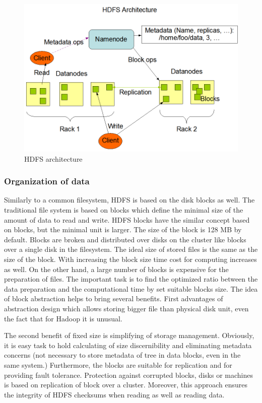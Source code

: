 \documentclass[a4paper,12pt,oneside]{report}
\begin{document}
\begin{figure}[!htbp]
    \centering
    \includegraphics[width=1\textwidth]{./img/hdfsarchitecture.png}
    \caption[HDFS architecture1]{\centering HDFS architecture \footnotemark}
\end{figure} 

		\subsubsection{Organization of data}
Similarly to  a common filesystem, HDFS is based on the disk blocks as well. The traditional
file system is based on blocks which define the minimal size of the amount of data to read and write.
HDFS blocks have the similar concept based on blocks, but the minimal unit is
larger. The size of the block is 128 MB by default. Blocks are broken and distributed
over disks on the cluster like blocks over a single disk in the filesystem. The ideal 
size of stored files is the same as the size of the block. With increasing the block 
size time cost for computing increases as well. On the other hand, a large number
of blocks is expensive for the preparation of files. The important task is to find the optimized 
ratio between the data preparation and the computational time by set suitable blocks size.
The idea of block abstraction helps to bring several benefits. First advantages of
abstraction design which allows storing bigger file than physical disk unit, 
even the fact that for Hadoop it is unusual.

The second benefit of fixed size is simplifying of storage management. Obviously, it is easy task
to hold calculating of size discernibility and eliminating metadata concerns (not necessary 
to store metadata of tree in data blocks, even in the same system.)
Furthermore, the blocks are suitable for replication and for providing fault tolerance. Protection
against corrupted blocks, disks or machines is based on replication of block over a cluster. 
Moreover, this approach ensures the integrity of HDFS checksums when reading as well as reading data.
\end{document}
